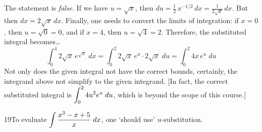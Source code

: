 \documentclass[11pt,letterpaper]{article}
\begin{document}
\sol The statement is \textit{false}. If we have $u= \sqrt{x}$, then $du= \frac{1}{2} \, x^{-1/2} \,dx= \frac{1}{2\sqrt{x}} \,dx$. But then $dx= 2 \sqrt{x} \, dx$. Finally, one needs to convert the limits of integration: if $x= 0$, then $u= \sqrt{0}= 0$, and if $x= 4$, then $u= \sqrt{4}= 2$. Therefore, the substituted integral becomes\dots
	\[
	\int_0^4 2 \sqrt{x} \, e^{\sqrt{x}} \;dx= \int_0^2 2 \sqrt{x} \, e^u \cdot 2 \sqrt{x} \; du= \int_0^2 4x \, e^u \; du
	\]
Not only does the given integral not have the correct bounds, certainly, the integrand above not simplify to the given integrand. [In fact, the correct substituted integral is $\displaystyle\int_0^2 4 u^2 e^u \;du$, which is beyond the scope of this course.]








19To evaluate $\displaystyle\int \dfrac{x^3 - x + 5}{x} \;dx$, one `should use' $u$-substitution.
\end{document}
